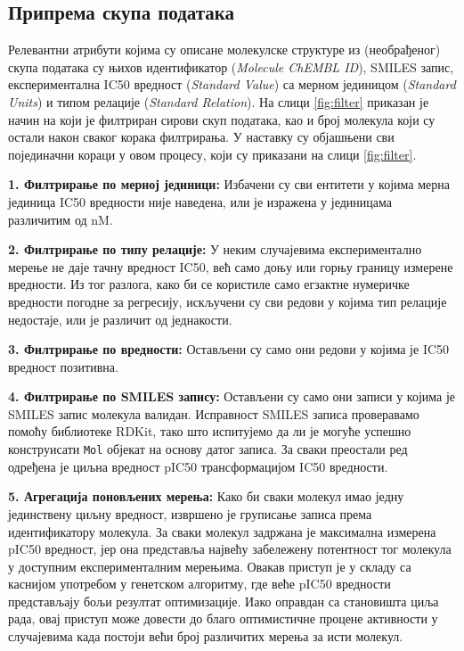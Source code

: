 \documentclass[12pt,oneside]{memoir}
\begin{document}
\subsection{Припрема скупа података}
\label{sec:feature-prep}

Релевантни атрибути којима су описане молекулске структуре из (необрађеног) скупа 
података су њихов идентификатор (\textit{Molecule ChEMBL ID}), SMILES запис, експериментална 
IC50 вредност (\textit{Standard Value}) са мерном јединицом (\textit{Standard Units}) 
и типом релације (\textit{Standard Relation}). На слици \ref{fig:filter} приказан је начин
на који је филтриран сирови скуп података, као и број молекула који су остали
након сваког корака филтрирања. У наставку су објашњени сви појединачни кораци у овом процесу, 
који су приказани на слици \ref{fig:filter}.

\textbf{1. Филтрирање по мерној јединици:} Избачени су сви ентитети у којима мерна јединица 
IC50 вредности није наведена, или је изражена у јединицама различитим од nM.

\textbf{2. Филтрирање по типу релације:}  У неким случајевима експериментално 
мерење не даје тачну вредност IC50, већ само доњу или горњу границу измерене вредности. 
Из тог разлога, како би се користиле само егзактне нумеричке вредности погодне за регресију, 
искључени су сви редови у којима тип релације недостаје, или је различит од једнакости.

\textbf{3. Филтрирање по вредности:} Остављени су само они редови у којима је IC50 
вредност позитивна. 

\textbf{4. Филтрирање по SMILES запису:} Остављени су само они записи у којима је SMILES 
запис молекула валидан. Исправност SMILES записа проверавамо помоћу библиотеке RDKit, тако што
испитујемо да ли је могуће успешно конструисати \texttt{Mol} објекат на основу датог записа.
За сваки преостали ред одређена је циљна вредност pIC50 трансформацијом IC50 вредности.


\textbf{5. Агрегација поновљених мерења:} Како би сваки молекул имао једну 
јединствену циљну вредност, извршено је груписање записа према идентификатору 
молекула. За сваки молекул задржана је максимална измерена pIC50 вредност, 
јер она представља највећу забележену потентност тог молекула у доступним 
експерименталним мерењима. Овакав приступ је у складу са каснијом употребом 
у генетском алгоритму, где веће pIC50 вредности представљају бољи резултат 
оптимизације. Иако оправдан са становишта циља рада, овај приступ може довести 
до благо оптимистичне процене активности у случајевима када постоји већи број 
различитих мерења за исти молекул.
\end{document}
